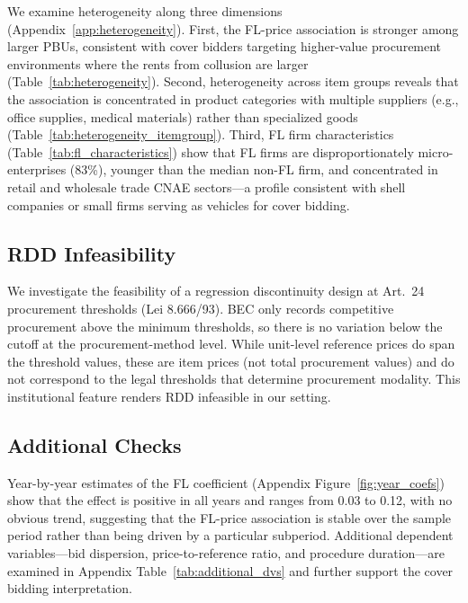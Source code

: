 We examine heterogeneity along three dimensions (Appendix~\ref{app:heterogeneity}). First, the FL-price association is stronger among larger PBUs, consistent with cover bidders targeting higher-value procurement environments where the rents from collusion are larger (Table~\ref{tab:heterogeneity}). Second, heterogeneity across item groups reveals that the association is concentrated in product categories with multiple suppliers (e.g., office supplies, medical materials) rather than specialized goods (Table~\ref{tab:heterogeneity_itemgroup}). Third, FL firm characteristics (Table~\ref{tab:fl_characteristics}) show that FL firms are disproportionately micro-enterprises (83\%), younger than the median non-FL firm, and concentrated in retail and wholesale trade CNAE sectors---a profile consistent with shell companies or small firms serving as vehicles for cover bidding.

\subsection{RDD Infeasibility}

We investigate the feasibility of a regression discontinuity design at Art.~24 procurement thresholds (Lei 8.666/93). BEC only records competitive procurement above the minimum thresholds, so there is no variation below the cutoff at the procurement-method level. While unit-level reference prices do span the threshold values, these are item prices (not total procurement values) and do not correspond to the legal thresholds that determine procurement modality. This institutional feature renders RDD infeasible in our setting.

\subsection{Additional Checks}

Year-by-year estimates of the FL coefficient (Appendix Figure~\ref{fig:year_coefs}) show that the effect is positive in all years and ranges from 0.03 to 0.12, with no obvious trend, suggesting that the FL-price association is stable over the sample period rather than being driven by a particular subperiod. Additional dependent variables---bid dispersion, price-to-reference ratio, and procedure duration---are examined in Appendix Table~\ref{tab:additional_dvs} and further support the cover bidding interpretation.
